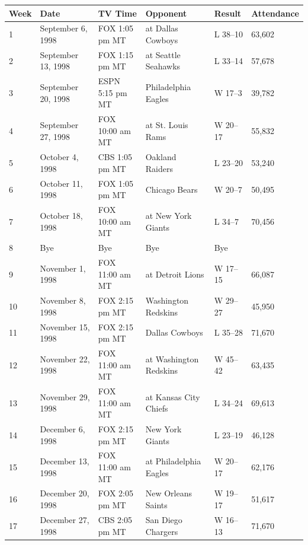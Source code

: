 \documentclass{article}
\begin{document}
\begin{tabular}{llllll}
\toprule
Week & Date & TV Time & Opponent & Result & Attendance \\
\midrule
1 & September 6, 1998 & FOX 1:05 pm MT & at Dallas Cowboys & L 38–10 & 63,602 \\
2 & September 13, 1998 & FOX 1:15 pm MT & at Seattle Seahawks & L 33–14 & 57,678 \\
3 & September 20, 1998 & ESPN 5:15 pm MT & Philadelphia Eagles & W 17–3 & 39,782 \\
4 & September 27, 1998 & FOX 10:00 am MT & at St. Louis Rams & W 20–17 & 55,832 \\
5 & October 4, 1998 & CBS 1:05 pm MT & Oakland Raiders & L 23–20 & 53,240 \\
6 & October 11, 1998 & FOX 1:05 pm MT & Chicago Bears & W 20–7 & 50,495 \\
7 & October 18, 1998 & FOX 10:00 am MT & at New York Giants & L 34–7 & 70,456 \\
8 & Bye & Bye & Bye & Bye &  \\
9 & November 1, 1998 & FOX 11:00 am MT & at Detroit Lions & W 17–15 & 66,087 \\
10 & November 8, 1998 & FOX 2:15 pm MT & Washington Redskins & W 29–27 & 45,950 \\
11 & November 15, 1998 & FOX 2:15 pm MT & Dallas Cowboys & L 35–28 & 71,670 \\
12 & November 22, 1998 & FOX 11:00 am MT & at Washington Redskins & W 45–42 & 63,435 \\
13 & November 29, 1998 & FOX 11:00 am MT & at Kansas City Chiefs & L 34–24 & 69,613 \\
14 & December 6, 1998 & FOX 2:15 pm MT & New York Giants & L 23–19 & 46,128 \\
15 & December 13, 1998 & FOX 11:00 am MT & at Philadelphia Eagles & W 20–17 & 62,176 \\
16 & December 20, 1998 & FOX 2:05 pm MT & New Orleans Saints & W 19–17 & 51,617 \\
17 & December 27, 1998 & CBS 2:05 pm MT & San Diego Chargers & W 16–13 & 71,670 \\
\bottomrule
\end{tabular}
\end{document}
